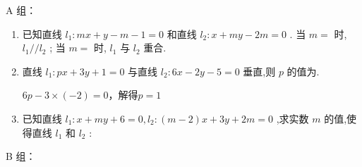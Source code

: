 A 组：
\begin{enumerate}
    \item 已知直线 ${l}_{1} : {mx} + y - m - 1 = 0$ 和直线 ${l}_{2} : x + {my} - {2m} = 0$ . 当 $m =$ 时, ${l}_{1}//{l}_{2}$ ; 当 $m =$ 时, ${l}_{1}$ 与 ${l}_{2}$ 重合.

    \item 直线 ${l}_{1} : {px} + {3y} + 1 = 0$ 与直线 ${l}_{2} : {6x} - {2y} - 5 = 0$ 垂直,则 $p$ 的值为.
    \begin{jieda}
        $6p-3\times(-2) = 0$，解得$p = 1$
    \end{jieda}

    \item 已知直线 ${l}_{1} : x + {my} + 6 = 0,{l}_{2} : \left( {m - 2}\right) x + {3y} + {2m} = 0$ ,求实数 $m$ 的值,使得直线 ${l}_{1}$ 和 ${l}_{2}$ :
    \begin{jieda}
    \end{jieda}

\end{enumerate}
B 组：
